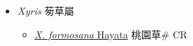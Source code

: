 
  \begin{itemize}
 \item[] \textit{Xyris} 茐草屬
                    
  \begin{itemize}
        \item[] \href{http://www.theplantlist.org/tpl1.1/search?q=Xyris+formosana}{\textit{X. formosana} Hayata}   桃園草\# CR
  \end{itemize}
  \end{itemize}
